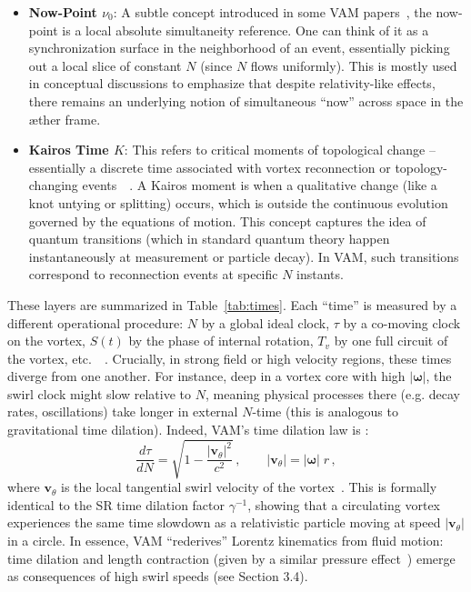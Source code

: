 \documentclass[preprint]{revtex4-2}
\begin{document}
\begin{itemize}
        \item \textbf{Now-Point $\nu_0$}: A subtle concept introduced in some VAM papers~\cite{reference_48}, the now-point is a local absolute simultaneity reference. One can think of it as a synchronization surface in the neighborhood of an event, essentially picking out a local slice of constant $N$ (since $N$ flows uniformly). This is mostly used in conceptual discussions to emphasize that despite relativity-like effects, there remains an underlying notion of simultaneous “now” across space in the æther frame.
        \item \textbf{Kairos Time $K$}: This refers to critical moments of topological change -- essentially a discrete time associated with vortex reconnection or topology-changing events~\cite{reference_49}~\cite{reference_50}. A Kairos moment is when a qualitative change (like a knot untying or splitting) occurs, which is outside the continuous evolution governed by the equations of motion. This concept captures the idea of quantum transitions (which in standard quantum theory happen instantaneously at measurement or particle decay). In VAM, such transitions correspond to reconnection events at specific $N$ instants.
    \end{itemize}

    These layers are summarized in Table~\ref{tab:times}. Each “time” is measured by a different operational procedure: $N$ by a global ideal clock, $\tau$ by a co-moving clock on the vortex, $S(t)$ by the phase of internal rotation, $T_v$ by one full circuit of the vortex, etc.~\cite{reference_51}~\cite{reference_52}. Crucially, in strong field or high velocity regions, these times diverge from one another. For instance, deep in a vortex core with high $|\boldsymbol{\omega}|$, the swirl clock might slow relative to $N$, meaning physical processes there (e.g. decay rates, oscillations) take longer in external $N$-time (this is analogous to gravitational time dilation). Indeed, VAM’s time dilation law is \cite{reference_6}:
    \begin{equation}
        \frac{d\tau}{dN} = \sqrt{1 - \frac{|\mathbf{v}_\theta|^2}{c^2}}\,,
        \qquad |\mathbf{v}_\theta| = |\boldsymbol{\omega}|\;r\,,
        \label{eq:time-dilation}
    \end{equation}
    where $\mathbf{v}_\theta$ is the local tangential swirl velocity of the vortex~\cite{reference_53}. This is formally identical to the SR time dilation factor $\gamma^{-1}$, showing that a circulating vortex experiences the same time slowdown as a relativistic particle moving at speed $|\mathbf{v}_\theta|$ in a circle. In essence, VAM “rederives” Lorentz kinematics from fluid motion: time dilation and length contraction (given by a similar pressure effect~\cite{reference_54}) emerge as consequences of high swirl speeds (see Section 3.4).
\end{document}

